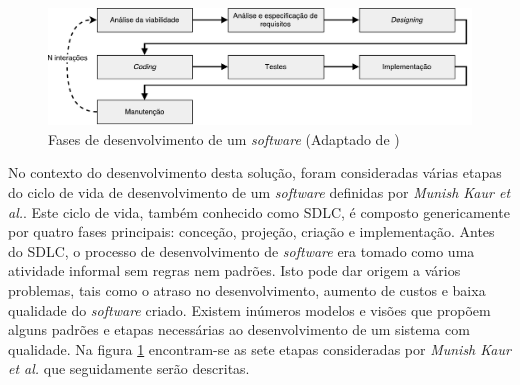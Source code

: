 \begin{figure}[!htb]
	\centering
	\includegraphics[scale=0.6]{esquemas/desenvolvimentoSW.pdf}
	\caption[Fases de desenvolvimento de um \textit{software} ]{Fases de desenvolvimento de um \textit{software} (Adaptado de \cite{Saini2014})}
	\label{sdlcartic}
\end{figure}


No contexto do desenvolvimento desta solução, foram consideradas várias etapas do ciclo de vida de desenvolvimento de um \textit{software} definidas por  \textit{Munish Kaur et al.}\cite{Saini2014}. Este ciclo de vida, também conhecido como \ac{SDLC}, é composto genericamente por quatro fases principais: conceção, projeção, criação e implementação. Antes do \ac{SDLC}, o processo de desenvolvimento de \textit{software} era tomado como uma atividade informal sem regras nem padrões. Isto pode dar  origem a vários problemas, tais como o atraso no desenvolvimento, aumento de custos e baixa qualidade do \textit{software} criado. Existem inúmeros modelos e visões que propõem alguns padrões e etapas necessárias ao desenvolvimento de um sistema com qualidade. Na figura \ref{sdlcartic} encontram-se as sete etapas consideradas por \textit{Munish Kaur et al.}\cite{Saini2014} que seguidamente serão descritas. 









